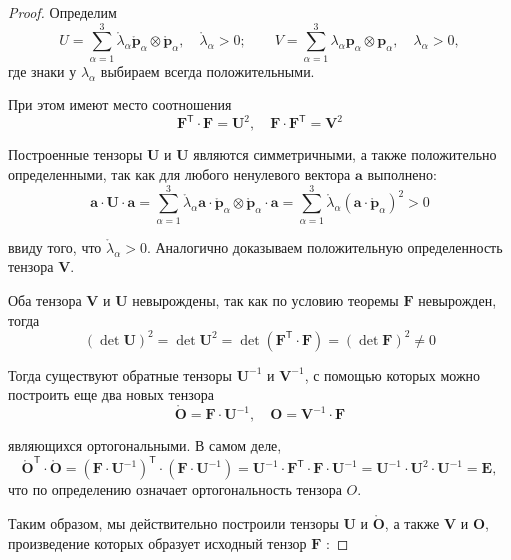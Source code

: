 \begin{proof}
Определим
\[
  U = \sum_{\alpha=1}^3 \mathring{\lambda}_\alpha
  \mathring{\mathbf{p}}_\alpha\otimes \mathring{\mathbf{p}}_\alpha, \quad
  \mathring{\lambda}_\alpha > 0; \qquad V = \sum_{\alpha = 1}^3
  \lambda_\alpha\mathbf{p}_\alpha \otimes \mathbf{p}_\alpha, \quad
  \lambda_\alpha > 0,
\]
где знаки у $\lambda_{\alpha}$ выбираем всегда положительными.

При этом имеют место соотношения
\[
\mathbf{F}^{\mathsf{T}} \cdot \mathbf{F}=\mathbf{U}^{2}, \quad \mathbf{F} \cdot \mathbf{F}^{\mathsf{T}}=\mathbf{V}^{2}
\]

Построенные тензоры $ \mathbf{U} $ и $ \mathbf{U} $ являются симметричными, а
также положительно определенными, так как для любого ненулевого вектора $
\mathbf{a} $
выполнено: \[
\mathbf{a} \cdot \mathbf{U} \cdot \mathbf{a}=\sum_{\alpha=1}^{3} \mathring{\lambda}_{\alpha} \mathbf{a} \cdot \mathring{\mathbf{p}}_{\alpha} \otimes \mathring{\mathbf{p}}_{\alpha} \cdot \mathbf{a}=\sum_{\alpha=1}^{3} \mathring{\lambda}_{\alpha}\left(\mathbf{a} \cdot \mathring{\mathbf{p}}_{\alpha}\right)^{2}>0
\]

ввиду того, что $\mathring{\lambda}_{\alpha}>0$. Аналогично доказываем
положительную определенность тензора $ \mathbf{V} $.

Оба тензора $ \mathbf{V} $ и $\mathbf{U}$ невырождены, так как по условию
теоремы $\mathbf{F}$ невырожден, тогда
\[
(\operatorname{det} \mathbf{U})^{2}=\operatorname{det} \mathbf{U}^{2}=\operatorname{det}\left(\mathbf{F}^{\mathsf{T}} \cdot \mathbf{F}\right)=(\operatorname{det} \mathbf{F})^{2} \neq 0
\]

Тогда существуют обратные тензоры $\mathbf{U}^{-1}$ и $\mathbf{V}^{-1}$, с помощью которых можно построить еще два новых тензора
\[
\mathring{\mathbf{O}}=\mathbf{F} \cdot \mathbf{U}^{-1}, \quad \mathbf{O}=\mathbf{V}^{-1} \cdot \mathbf{F}
\]

являющихся ортогональными. В самом деле,
\[
\mathring{\mathbf{O}}^{\mathsf{T}} \cdot \mathring{\mathbf{O}}=\left(\mathbf{F}
\cdot \mathbf{U}^{-1}\right)^{\mathsf{T}} \cdot\left(\mathbf{F} \cdot
\mathbf{U}^{-1}\right)=\mathbf{U}^{-1} \cdot \mathbf{F}^{\mathsf{T}} \cdot
\mathbf{F} \cdot \mathbf{U}^{-1}=\mathbf{U}^{-1} \cdot \mathbf{U}^{2} \cdot
\mathbf{U}^{-1}=\mathbf{E},
\]
что по определению означает ортогональность тензора $ O $.

Таким образом, мы действительно построили тензоры $\mathbf{U}$ и $\mathring{\mathbf{O}}$, а также $\mathbf{V}$ и $\mathbf{O}$, произведение которых образует исходный тензор $\mathbf{F}$ :


\end{proof}
